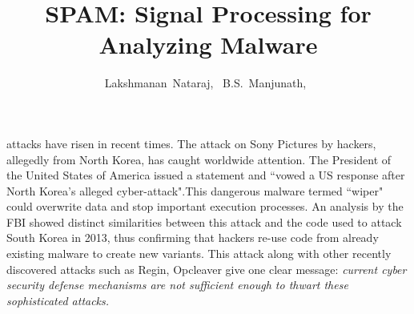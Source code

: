 \documentclass[journal]{IEEEtran}
\begin{document}
\title{SPAM: Signal Processing for Analyzing Malware}

\author{Lakshmanan~Nataraj,~
        B.S.~Manjunath,~
}





\maketitle

\IEEEpeerreviewmaketitle









 attacks have risen in recent times.
The attack on Sony Pictures by hackers, allegedly from North Korea, has caught worldwide attention. 
The President of the United States of America issued a statement and ``vowed a US response after North Korea's alleged cyber-attack".This dangerous malware termed ``wiper" could overwrite data and stop important execution processes.
An analysis by the FBI showed distinct similarities between this attack and the code used to attack South Korea in 2013, thus confirming that hackers re-use code from already existing malware to create new variants.
This attack along with other recently discovered attacks such as Regin, Opcleaver give one clear message: \emph{current cyber security defense mechanisms are not sufficient enough to thwart these sophisticated attacks.}
\end{document}
